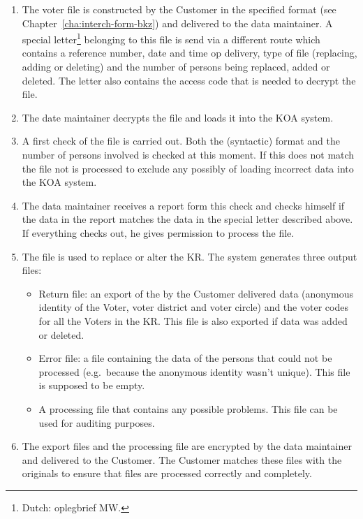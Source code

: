 \begin{enumerate}
	\item The voter file is constructed by the Customer in the
	specified format (see Chapter~\ref{cha:interch-form-bkz}) and
	delivered to the data maintainer. A special
	letter\footnote{Dutch: oplegbrief MW.} belonging to this file
	is send via a different route which contains a reference
	number, date and time op delivery, type of file (replacing,
	adding or deleting) and the number of persons being replaced,
	added or deleted. The letter also contains the access code that
	is needed to decrypt the file.
	
	\item The date maintainer decrypts the file and loads it into
	the KOA system.

	\item A first check of the file is carried out. Both the
	(syntactic) format and the number of persons involved is
	checked at this moment. If this does not match the file not is
	processed to exclude any possibly of loading incorrect data
	into the KOA system.

	\item The data maintainer receives a report form this check
	and checks himself if the data in the report matches the data
	in the special letter described above. If everything checks
	out, he gives permission to process the file.

	\item The file is used to replace or alter the KR. The system
	generates three output files:

	\begin{itemize} 

		\item Return file: an export of the by the Customer
		delivered data (anonymous identity of the Voter, voter
		district and voter circle) and the voter codes for all
		the Voters in the KR. This file is also exported if
		data was added or deleted.

		\item Error file: a file containing the data of the
		persons that could not be processed (e.g.\ because the
		anonymous identity wasn't unique). This file is
		supposed to be empty.

		\item A processing file that contains any possible
		problems. This file can be used for auditing purposes.
	\end{itemize}

	\item The export files and the processing file are encrypted
	by the data maintainer and delivered to the Customer. The
	Customer matches these files with the originals to ensure that
	files are processed correctly and completely.


\end{enumerate}
